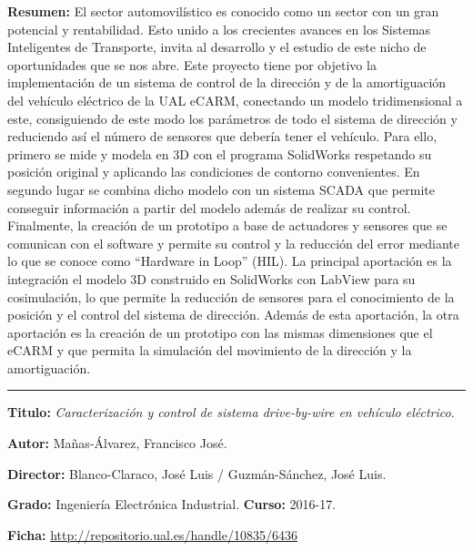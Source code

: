 \textbf{Resumen:} El sector automovilístico es conocido como un sector con un gran potencial y rentabilidad. Esto unido a los crecientes avances en los Sistemas Inteligentes de Transporte, invita al desarrollo y el estudio de este nicho de oportunidades que se nos abre. Este proyecto tiene por objetivo la implementación de un sistema de control de la dirección y de la amortiguación del vehículo eléctrico de la UAL eCARM, conectando un modelo tridimensional a este, consiguiendo de este modo los parámetros de todo el sistema de dirección y reduciendo así el número de sensores que debería tener el vehículo. Para ello, primero se mide y modela en 3D con el programa SolidWorks respetando su posición original y aplicando las condiciones de contorno convenientes. En segundo lugar se combina dicho modelo con un sistema SCADA que permite conseguir información a partir del modelo además de realizar su control. Finalmente, la creación de un prototipo a base de actuadores y sensores que se comunican con el software y permite su control y la reducción del error mediante lo que se conoce como “Hardware in Loop” (HIL). La principal aportación es la integración el modelo 3D construido en SolidWorks con LabView para su cosimulación, lo que permite la reducción de sensores para el conocimiento de la posición y el control del sistema de dirección. Además de esta aportación, la otra aportación es la creación de un prototipo con las mismas dimensiones que el eCARM y que permita la simulación del movimiento de la dirección y la amortiguación.

\vspace{6pt} \hrule \vspace{6pt}

\textbf{Titulo:} \textit{Caracterización y control de sistema drive-by-wire en vehículo eléctrico}\cite{manas2017UALeCARM}.

\textbf{Autor:} Mañas-Álvarez, Francisco José.

\textbf{Director:} Blanco-Claraco, José Luis / Guzmán-Sánchez, José Luis.

\textbf{Grado:} Ingeniería Electrónica Industrial. \textbf{Curso:} 2016-17. 

\textbf{Ficha:} \url{http://repositorio.ual.es/handle/10835/6436}
 
